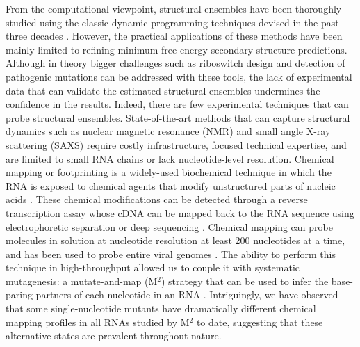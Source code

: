 \documentclass[12pt]{article}
\begin{document}
From the computational viewpoint, structural ensembles have been thoroughly studied using the classic dynamic programming techniques devised in the past three decades \cite{McCaskill,Ding2005b}. However, the practical applications of  these methods have been mainly limited to refining minimum free energy secondary structure predictions. Although in theory bigger challenges such as riboswitch design and detection of pathogenic mutations can be addressed with these tools, the lack of experimental data that can validate the estimated structural ensembles undermines the confidence in the results. Indeed, there are few experimental techniques that can probe structural ensembles. State-of-the-art methods that can capture structural dynamics such as nuclear magnetic resonance (NMR) \cite{Bothe2011} and small angle X-ray scattering (SAXS) \cite{Russell2002,Wang2009} require costly infrastructure, focused technical expertise, and are limited to small RNA chains or lack nucleotide-level resolution. Chemical mapping or footprinting is a widely-used biochemical technique in which the RNA is exposed to chemical agents that modify unstructured parts of nucleic acids \cite{Mortimer2007,Tijerina2007}. These chemical modifications can be detected through a reverse transcription assay whose cDNA can be mapped back to the RNA sequence using electrophoretic separation or deep sequencing \cite{Mitra2008,Lucks2011}. Chemical mapping can probe molecules in solution at nucleotide resolution at least 200 nucleotides at a time, and has been used to probe entire viral genomes \cite{Wilkinson2008,Watts2009}. The ability to perform this technique in high-throughput allowed us to couple it with systematic mutagenesis: a mutate-and-map (M$^2$) strategy that can be used to infer the base-paring partners of each nucleotide in an RNA \cite{Kladwang2011,Kladwang2011f}. Intriguingly, we have observed that some single-nucleotide mutants have dramatically different chemical mapping profiles in all RNAs studied by M$^2$ to date, suggesting that these alternative states are prevalent throughout nature.
\end{document}
